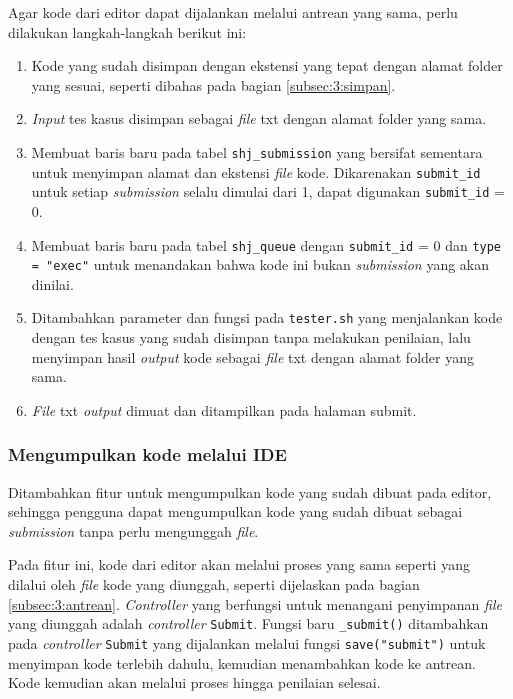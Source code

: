Agar kode dari editor dapat dijalankan melalui antrean yang sama, perlu dilakukan langkah-langkah berikut ini:
\begin{enumerate}
    \item Kode yang sudah disimpan dengan ekstensi yang tepat dengan alamat folder yang sesuai, seperti dibahas pada bagian \ref{subsec:3:simpan}.
    \item \textit{Input} tes kasus disimpan sebagai \textit{file} txt dengan alamat folder yang sama.
    \item Membuat baris baru pada tabel \verb|shj_submission| yang bersifat sementara untuk menyimpan alamat dan ekstensi \textit{file} kode. Dikarenakan \verb|submit_id| untuk setiap \textit{submission} selalu dimulai dari 1, dapat digunakan \verb|submit_id| = 0.
    \item Membuat baris baru pada tabel \verb|shj_queue| dengan \verb|submit_id| = 0 dan \verb|type = "exec"| untuk menandakan bahwa kode ini bukan \textit{submission} yang akan dinilai.
    \item Ditambahkan parameter dan fungsi pada \verb|tester.sh| yang menjalankan kode dengan tes kasus yang sudah disimpan tanpa melakukan penilaian, lalu menyimpan hasil \textit{output} kode sebagai \textit{file} txt dengan alamat folder yang sama.
    \item \textit{File} txt \textit{output} dimuat dan ditampilkan pada halaman submit.
\end{enumerate}
    
\subsubsection{Mengumpulkan kode melalui IDE}
Ditambahkan fitur untuk mengumpulkan kode yang sudah dibuat pada editor, sehingga pengguna dapat mengumpulkan kode yang sudah dibuat sebagai \textit{submission} tanpa perlu mengunggah \textit{file}.

Pada fitur ini, kode dari editor akan melalui proses yang sama seperti yang dilalui oleh \textit{file} kode yang diunggah, seperti dijelaskan pada bagian \ref{subsec:3:antrean}. \textit{Controller} yang berfungsi untuk menangani penyimpanan \textit{file} yang diunggah adalah \textit{controller} \texttt{Submit}. Fungsi baru \verb|_submit()| ditambahkan pada \textit{controller} \texttt{Submit} yang dijalankan melalui fungsi \verb|save("submit")| untuk menyimpan kode terlebih dahulu, kemudian menambahkan kode ke antrean. Kode kemudian akan melalui proses hingga penilaian selesai.
    
